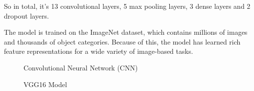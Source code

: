 \documentclass[
  letterpaper,
  DIV=11,
  numbers=noendperiod]{scrartcl}
\begin{document}
So in total, it's 13 convolutional layers, 5 max pooling layers, 3 dense
layers and 2 dropout layers.

The model is trained on the ImageNet dataset, which contains millions of
images and thousands of object categories. Because of this, the model
has learned rich feature representations for a wide variety of
image-based tasks.

\begin{figure}

\begin{minipage}[b]{0.50\linewidth}

{\centering 


\caption{Convolutional Neural Network (CNN)}

}

\end{minipage}%
%
\begin{minipage}[b]{0.50\linewidth}

{\centering 


\caption{VGG16 Model}

}

\end{minipage}%

\end{figure}
\end{document}
